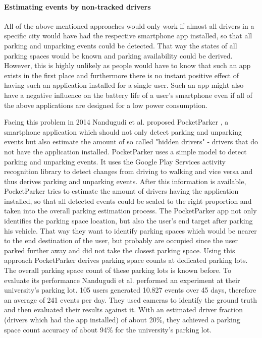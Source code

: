 \paragraph{Estimating events by non-tracked drivers}

All of the above mentioned approaches would only work if almost all drivers in a specific city would have had the respective smartphone app installed, so that all parking and unparking events could be detected. That way the states of all parking spaces would be known and parking availability could be derived. However, this is highly unlikely as people would have to know that such an app exists in the first place and furthermore there is no instant positive effect of having such an application installed for a single user. Such an app might also have a negative influence on the battery life of a user's smartphone even if all of the above applications are designed for a low power consumption. 

Facing this problem in 2014 Nandugudi et al. proposed PocketParker \cite{Nandugudi:2014:PPP:2632048.2632098}, a smartphone application which should not only detect parking and unparking events but also estimate the amount of so called "hidden drivers" - drivers that do not have the application installed. PocketParker uses a simple model to detect parking and unparking events. It uses the Google Play Services activity recognition library to detect changes from driving to walking and vice versa and thus derives parking and unparking events. After this information is available, PocketParker tries to estimate the amount of drivers having the application installed, so that all detected events could be scaled to the right proportion and taken into the overall parking estimation process. The PocketParker app not only identifies the parking space location, but also the user's end target after parking his vehicle. That way they want to identify parking spaces which would be nearer to the end destination of the user, but probably are occupied since the user parked further away and did not take the closest parking space. Using this approach PocketParker derives parking space counts at dedicated parking lots. The overall parking space count of these parking lots is known before. To evaluate its performance Nandugudi et al. performed an experiment at their university's parking lot. 105 users generated 10.827 events over 45 days, therefore an average of 241 events per day. They used cameras to identify the ground truth and then evaluated their results against it. With an estimated driver fraction (drivers which had the app installed) of about 20\%, they achieved a parking space count accuracy of about 94\% for the university's parking lot.

